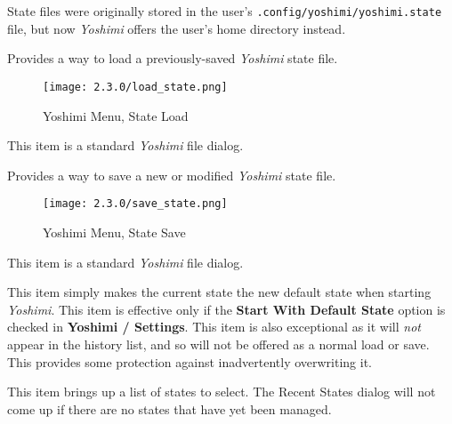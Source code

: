    State files were originally stored in the
   user's \texttt{.config/yoshimi/yoshimi.state} file, but
   now \textsl{Yoshimi} offers the user's home directory instead.

   \setcounter{ItemCounter}{0}      %

   Provides a way to load a previously-saved \textsl{Yoshimi} state file.

\begin{figure}[H]
   \centering
   \texttt{[image: 2.3.0/load\_state.png]}
   \caption{Yoshimi Menu, State Load}
   \label{fig:yoshimi_menu_state_load}
\end{figure}

   This item is a standard \textsl{Yoshimi} file dialog.

   Provides a way to save a new or modified \textsl{Yoshimi} state file.

\begin{figure}[H]
   \centering
   \texttt{[image: 2.3.0/save\_state.png]}
   \caption{Yoshimi Menu, State Save}
   \label{fig:yoshimi_menu_state_save}
\end{figure}

   This item is a standard \textsl{Yoshimi} file dialog.

   This item simply makes the current state the new default state when starting
   \textsl{Yoshimi}.
   This item is effective only if the \textbf{Start With Default State}
   option is checked in \textbf{Yoshimi / Settings}. This item is also
   exceptional as it will \textsl{not} appear in the history list, and so
   will not be offered as a normal load or save. This provides some protection
   against inadvertently overwriting it.

   This item brings up a list of states to select.
   The Recent States dialog will not come up if there are no states that have
   yet been managed.

